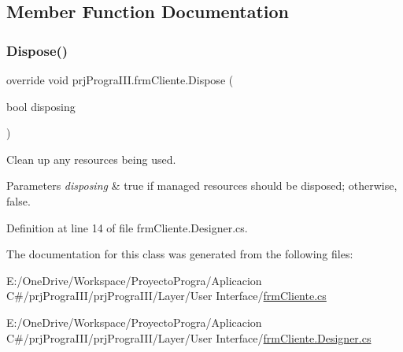 \subsection{Member Function Documentation}
\hypertarget{classprj_progra_i_i_i_1_1frm_cliente_aad5a3a46965d869e2acb805f557a8cc5}{}\label{classprj_progra_i_i_i_1_1frm_cliente_aad5a3a46965d869e2acb805f557a8cc5} 
\subsubsection{\texorpdfstring{Dispose()}{Dispose()}}
{\footnotesize\ttfamily override void prj\+Progra\+I\+I\+I.\+frm\+Cliente.\+Dispose (\begin{DoxyParamCaption}\item[{bool}]{disposing }\end{DoxyParamCaption})\hspace{0.3cm}{\ttfamily [protected]}}



Clean up any resources being used. 


\begin{DoxyParams}{Parameters}
{\em disposing} & true if managed resources should be disposed; otherwise, false.\\
\hline
\end{DoxyParams}


Definition at line 14 of file frm\+Cliente.\+Designer.\+cs.



The documentation for this class was generated from the following files\+:\begin{DoxyCompactItemize}
\item 
E\+:/\+One\+Drive/\+Workspace/\+Proyecto\+Progra/\+Aplicacion C\#/prj\+Progra\+I\+I\+I/prj\+Progra\+I\+I\+I/\+Layer/\+User Interface/\hyperlink{frm_cliente_8cs}{frm\+Cliente.\+cs}\item 
E\+:/\+One\+Drive/\+Workspace/\+Proyecto\+Progra/\+Aplicacion C\#/prj\+Progra\+I\+I\+I/prj\+Progra\+I\+I\+I/\+Layer/\+User Interface/\hyperlink{frm_cliente_8_designer_8cs}{frm\+Cliente.\+Designer.\+cs}\end{DoxyCompactItemize}
